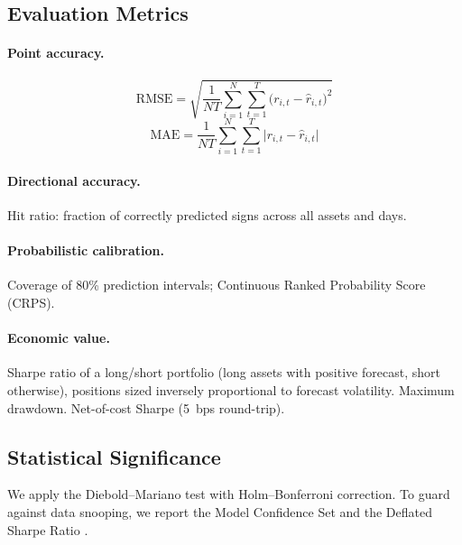 \documentclass[11pt,a4paper,twocolumn]{article}
\begin{document}
\subsection{Evaluation Metrics}

\paragraph{Point accuracy.}
\begin{equation}
\text{RMSE} = \sqrt{\frac{1}{NT}\sum_{i=1}^{N}\sum_{t=1}^{T}
              \bigl(r_{i,t}-\hat{r}_{i,t}\bigr)^2}
\end{equation}
\begin{equation}
\text{MAE} = \frac{1}{NT}\sum_{i=1}^{N}\sum_{t=1}^{T}
             \bigl|r_{i,t}-\hat{r}_{i,t}\bigr|
\end{equation}

\paragraph{Directional accuracy.}
Hit ratio: fraction of correctly predicted signs across all assets and days.

\paragraph{Probabilistic calibration.}
Coverage of 80\% prediction intervals; Continuous Ranked Probability Score
(CRPS).

\paragraph{Economic value.}
Sharpe ratio of a long/short portfolio (long assets with positive forecast,
short otherwise), positions sized inversely proportional to forecast volatility.
Maximum drawdown.  Net-of-cost Sharpe (5~bps round-trip).

\subsection{Statistical Significance}

We apply the Diebold--Mariano test \citep{diebold1995} with Holm--Bonferroni
correction.  To guard against data snooping, we report the Model Confidence Set
\citep{hansen2011} and the Deflated Sharpe Ratio \citep{bailey2014}.


\end{document}
